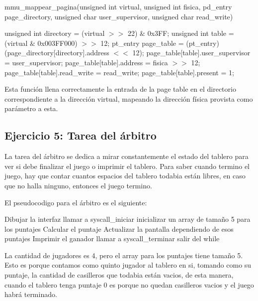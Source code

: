 \documentclass[a4paper,10pt,twoside]{article}
\newenvironment{pseudocodigo}
    {\vspace{0.5em} \begin{algorithmic}}
    {\end{algorithmic} \vspace{0.5em}}
\begin{document}
mmu\_mappear\_pagina(unsigned int virtual, unsigned int fisica, pd\_entry\* page\_directory, unsigned char user\_supervisor, unsigned char read\_write)
\begin{pseudocodigo}
  \STATE unsigned int directory = (virtual $>>$ 22) $\&$ 0x3FF;
  \STATE unsigned int table = (virtual $\&$ 0x003FF000) $>>$ 12;
  \STATE 
  \STATE pt\_entry\* page\_table = (pt\_entry\*) (page\_directory[directory].address $<<$ 12);
  \STATE 
  \STATE page\_table[table].user\_supervisor = user\_supervisor;
  \STATE page\_table[table].address = fisica $>>$ 12;
  \STATE page\_table[table].read\_write = read\_write;
  \STATE page\_table[table].present = 1;
\end{pseudocodigo}

Esta función llena correctamente la entrada de la page table en el directorio correspondiente a la dirección virtual, mapeando la dirección física provista como parámetro a esta.\\

\subsection{Ejercicio 5: Tarea del árbitro}

La tarea del árbitro se dedica a mirar constantemente el estado del tablero para ver si debe finalizar el juego o imprimir el tablero.
Para saber cuando termino el juego, hay que contar cuantos espacios del tablero todabia están libres, en caso que no halla ninguno, entonces el juego termino.

El pseudocodigo para el árbitro es el siguiente:\\

\begin{pseudocodigo}
  \STATE Dibujar la interfaz
  \STATE llamar a syscall\_iniciar
  \STATE inicializar un array de tamaño 5 para los puntajes
  \STATE
    \STATE
    \STATE Calcular el puntaje
    \STATE Actualizar la pantalla dependiendo de esos puntajes
    \STATE
      \STATE
      \STATE Imprimir el ganador
      \STATE llamar a syscall\_terminar
      \STATE salir del while
    \ENDIF
  \ENDWHILE
  \STATE
\end{pseudocodigo}

La cantidad de jugadores es 4, pero el array para los puntajes tiene tamaño 5. Esto es porque contamos como quinto  jugador al tablero en si, tomando como su puntaje, la cantidad de casilleros que todabia están vacios, de esta manera, cuando el tablero tenga puntaje $0$ es porque no quedan casilleros vacios y el juego habrá terminado.
\end{document}
